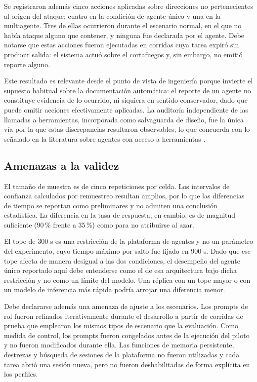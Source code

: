 \documentclass[conference]{IEEEtran}
\begin{document}
Se registraron además cinco acciones aplicadas sobre direcciones no pertenecientes al
origen del ataque: cuatro en la condición de agente único y una en la multiagente.
Tres de ellas ocurrieron durante el escenario normal, en el que no había ataque
alguno que contener, y ninguna fue declarada por el agente. Debe notarse que estas
acciones fueron ejecutadas en corridas cuya tarea expiró sin producir salida: el
sistema actuó sobre el cortafuegos y, sin embargo, no emitió reporte alguno.

Este resultado es relevante desde el punto de vista de ingeniería porque invierte el
supuesto habitual sobre la documentación automática: el reporte de un agente no
constituye evidencia de lo ocurrido, ni siquiera en sentido conservador, dado que
puede omitir acciones efectivamente aplicadas. La auditoría independiente de las
llamadas a herramientas, incorporada como salvaguarda de diseño, fue la única vía por
la que estas discrepancias resultaron observables, lo que concuerda con lo señalado en
la literatura sobre agentes con acceso a herramientas \cite{hu2026, debenedetti2026}.

\subsection{Amenazas a la validez}
El tamaño de muestra es de cinco repeticiones por celda. Los intervalos de confianza
calculados por remuestreo resultan amplios, por lo que las diferencias de tiempo se
reportan como preliminares y no admiten una conclusión estadística. La diferencia en
la tasa de respuesta, en cambio, es de magnitud suficiente (90\,\% frente a 35\,\%)
como para no atribuirse al azar.

El tope de 300 s es una restricción de la plataforma de agentes y no un parámetro del
experimento, cuyo tiempo máximo por salto fue fijado en 900 s. Dado que ese tope
afecta de manera desigual a las dos condiciones, el desempeño del agente único
reportado aquí debe entenderse como el de esa arquitectura bajo dicha restricción y no
como un límite del modelo. Una réplica con un tope mayor o con un modelo de inferencia
más rápida podría arrojar una diferencia menor.

Debe declararse además una amenaza de ajuste a los escenarios. Los prompts de rol
fueron refinados iterativamente durante el desarrollo a partir de corridas de prueba
que emplearon los mismos tipos de escenario que la evaluación. Como medida de control,
los prompts fueron congelados antes de la ejecución del piloto y no fueron modificados
durante ella. Las funciones de memoria persistente, destrezas y búsqueda de sesiones
de la plataforma no fueron utilizadas y cada tarea abrió una sesión nueva, pero no
fueron deshabilitadas de forma explícita en los perfiles.
\end{document}
